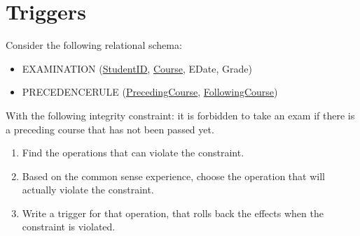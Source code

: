 \section{Triggers}

Consider the following relational schema: 
\begin{itemize}
    \item EXAMINATION (\underline{StudentID}, \underline{Course}, EDate, Grade)
    \item PRECEDENCERULE (\underline{PrecedingCourse}, \underline{FollowingCourse})
\end{itemize}
With the following integrity constraint: it is forbidden to take an exam if there is a preceding course that has not been passed yet.
\begin{enumerate}
    \item Find the operations that can violate the constraint.
    \item Based on the common sense experience, choose the operation that will actually violate the constraint. 
    \item Write a trigger for that operation, that rolls back the effects when the constraint is violated. 
\end{enumerate}

